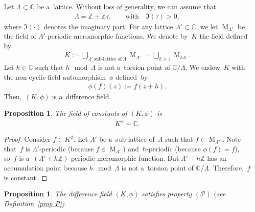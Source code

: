 \documentclass[11pt]{article}
\numberwithin{equation}{section}
\newtheorem{Proposition}[Theorem]{Proposition}
{ \theoremstyle{definition}
\newtheorem{Definition}[Theorem]{Definition}
\newtheorem{Remark}[Theorem]{Remark} }
\begin{document}
Let $\Lambda \subset \mathbb C$ be a~lattice.
Without loss of generality, we can assume that
\begin{gather*}
\Lambda=\mathbb Z +\mathbb Z \tau, \qquad \text{with} \quad \Im (\tau)>0,
\end{gather*}
where $\Im(\cdot)$ denotes the imaginary part.
For any lattice $\Lambda' \subset \mathbb C$, we let $\operatorname{M}_{\Lambda'}$ be the f\/ield of $\Lambda'$-periodic
meromorphic functions.
We denote by~$K$ the f\/ield def\/ined by
\begin{gather*}
K:= \bigcup_{\Lambda' \; \text{sub-lattice of} \; \Lambda} \operatorname{M}_{\Lambda'} =\bigcup_{k \geq 1} \operatorname{M}_{k  \Lambda}.
\end{gather*}
Let $h \in \mathbb C$ such that $h \mod \Lambda$ is not a~torsion point of $\mathbb C/\Lambda$.
We endow~$K$ with the non-cyclic f\/ield automorphism~$\phi$ def\/ined~by
\begin{gather*}
\phi(f)(z):=f(z+h).
\end{gather*}
Then,~$(K,\phi)$ is a~dif\/ference f\/ield.

\begin{Proposition}
The field of constants of $(K,\phi)$ is
\begin{gather*}
K^{\phi}=\mathbb C.
\end{gather*}
\end{Proposition}

\begin{proof}
Consider $f\in K^{\phi}$.
Let $\Lambda'$ be a~sub-lattice of~$\Lambda$ such that $f \in \operatorname{M}_{\Lambda'}$.
Note that~$f$ is $\Lambda'$-periodic (because $f \in \operatorname{M}_{\Lambda'}$) and~$h$-periodic (because
$\phi(f)=f$), so~$f$ is a~$(\Lambda' + h\mathbb Z)$-periodic meromorphic function.
But $\Lambda' + h\mathbb Z$ has an accumulation point because $h \mod \Lambda$ is not a~torsion point of $\mathbb
C/\Lambda$.
Therefore,~$f$ is constant.
\end{proof}

\begin{Proposition}
The difference field $(K,\phi)$ satisfies property $(\mathcal{P})$ $($see Definition~{\rm \ref{prop P})}.
\end{Proposition}
\end{document}
